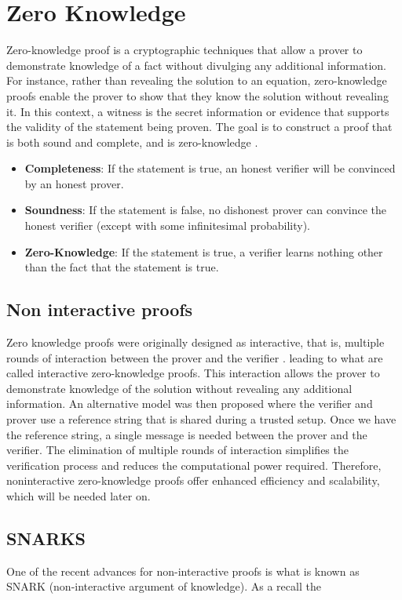 \section{Zero Knowledge}
Zero-knowledge proof is a cryptographic techniques that allow a prover to demonstrate knowledge of a fact without divulging any additional information. 
For instance, rather than revealing the solution to an equation, zero-knowledge proofs enable the prover to show that they know the solution without revealing it. 
In this context, a witness is the secret information or evidence that supports the validity of the statement being proven. 
The goal is to construct a proof that is both sound and complete, and is zero-knowledge \cite{LZK}.

\label{subsec:zkp}
\begin{itemize}
\item \textbf{Completeness}: If the statement is true, an honest verifier will be convinced by an honest prover.
\item \textbf{Soundness}: If the statement is false, no dishonest prover can convince the honest verifier (except with some infinitesimal probability).
\item \textbf{Zero-Knowledge}: If the statement is true,  a verifier learns nothing other than the fact that the statement is true. \cite{LC23}
\end{itemize}


\subsection{Non interactive proofs}

Zero knowledge proofs were originally designed as interactive, that is, multiple rounds of interaction between the prover and the verifier \cite{GMR89}.
leading to what are called interactive zero-knowledge proofs. This interaction allows the prover to demonstrate knowledge of the solution without revealing any additional information.
An alternative model was then proposed where the verifier and prover use a reference string that is shared during a trusted setup. Once we have the reference string, a single message is needed between the prover and the verifier.
The elimination of multiple rounds of interaction simplifies the verification process and reduces the computational power required.
Therefore, noninteractive zero-knowledge proofs offer enhanced efficiency and scalability, which will be needed later on.  \cite{BFM88} \cite{GMW91}


\subsection{SNARKS}
One of the recent advances for non-interactive proofs is what is known as SNARK (non-interactive argument of knowledge).
As a recall the 

